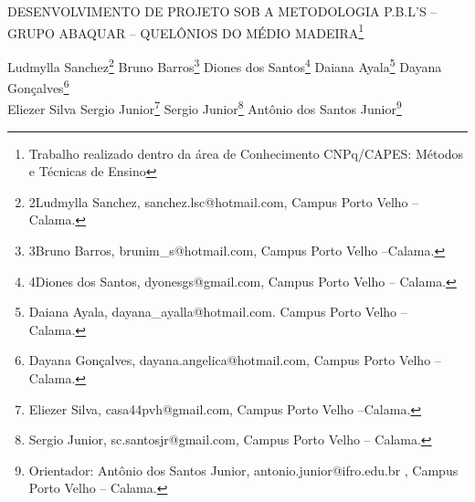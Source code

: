 \documentclass[article,12pt,onesidea,4paper,english,brazil]{abntex2}
\begin{document}
	
	
	\frenchspacing 
	
	\begin{center}
		\LARGE DESENVOLVIMENTO DE PROJETO SOB A METODOLOGIA P.B.L’S -- GRUPO ABAQUAR -- QUELÔNIOS DO MÉDIO MADEIRA\footnote{Trabalho realizado dentro da área de Conhecimento CNPq/CAPES: Métodos e Técnicas de Ensino}
		
		\normalsize
		Ludmylla Sanchez\footnote{2Ludmylla Sanchez, sanchez.lsc@hotmail.com, Campus Porto Velho –Calama.} 
		Bruno Barros\footnote{3Bruno Barros, brunim\_s@hotmail.com, Campus Porto Velho –Calama.} 
		Diones dos Santos\footnote{4Diones dos Santos, dyonesgs@gmail.com, Campus Porto Velho – Calama.} 
		Daiana Ayala\footnote{Daiana Ayala, dayana\_ayalla@hotmail.com. Campus Porto Velho – Calama.} 
		Dayana Gonçalves\footnote{Dayana Gonçalves, dayana.angelica@hotmail.com, Campus Porto Velho – Calama.}\\
		Eliezer Silva Sergio Junior\footnote{Eliezer Silva, casa44pvh@gmail.com, Campus Porto Velho –Calama.}
		Sergio Junior\footnote{Sergio Junior, sc.santosjr@gmail.com, Campus Porto Velho – Calama.}
		Antônio dos Santos Junior\footnote{Orientador: Antônio dos Santos Junior, antonio.junior@ifro.edu.br , Campus Porto Velho – Calama.}
	\end{center}
	
\end{document}
